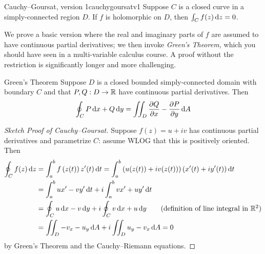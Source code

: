 \begin{thm}{Cauchy--Goursat, version 1}{cauchygoursatv1}
Suppose $C$ is a closed curve in a simply-connected region $D$. If $f$ is holomorphic on $D$, then $\int_Cf(z)\,\dz=0$.
\end{thm}

We prove a basic version where the real and imaginary parts of $f$ are assumed to have continuous partial derivatives; we then invoke \emph{Green's Theorem,} which you should have seen in a multi-variable calculus course. A proof without the restriction is significantly longer and more challenging.

\begin{lemm}{Green's Theorem}{}
Suppose $D$ is a closed bounded simply-connected domain with boundary $C$ and that $P,Q:D\to\R$ have continuous partial derivatives. Then
\[\oint_CP\,\dx+Q\,\dy=\iint_D\partials[Q]{x}-\partials[P]{y}\,\dA\] 
\end{lemm}

\begin{proof}[Sketch Proof of Cauchy--Goursat]
Suppose $f(z)=u+iv$ has continuous partial derivatives and parametrize $C$: assume WLOG that this is positively oriented. Then
\begin{align*}
\oint_Cf(z)\,\dz&=\int_a^bf\left(z(t)\right)z'(t)\,\dt =\int_a^b\left(u(z(t))+iv(z(t))\right)\left(x'(t)+iy'(t)\right)\dt\\
&=\int_a^bux'-vy'\,\dt+i\int_a^bvx'+uy'\,\dt\\
&=\oint_Cu\,\dx-v\,\dy+i\oint_Cv\,\dx+u\,\dy \tag{definition of line integral in $\R^2$}\\
&=\iint_D-v_x-u_y\,\dA+i\iint_Du_y-v_x\,\dA=0
\end{align*}
by Green's Theorem and the Cauchy--Riemann equations. 
\end{proof}

